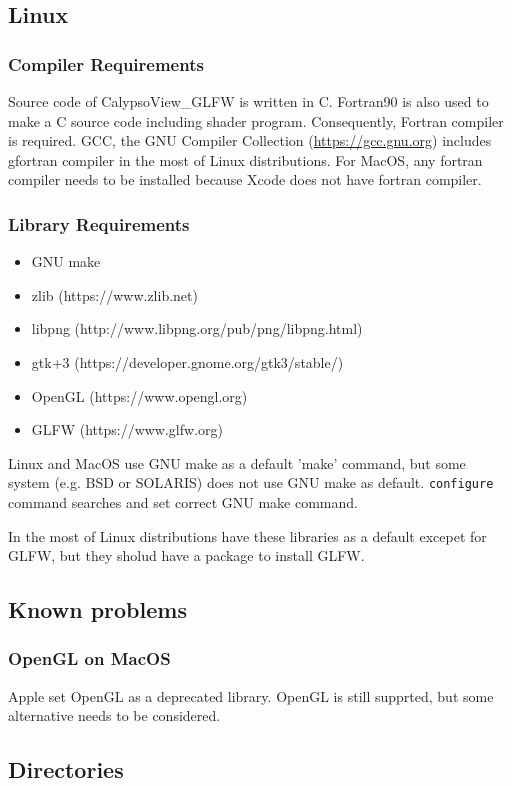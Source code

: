 \subsection{Linux}
\subsubsection{Compiler Requirements}
Source code of CalypsoView\_GLFW is written in C. Fortran90 is also used to make a C source code including shader program. Consequently, Fortran compiler is required. GCC, the GNU Compiler Collection (\url{https://gcc.gnu.org}) includes gfortran compiler in the most of Linux distributions. For MacOS, any fortran compiler needs to be installed because Xcode does not have fortran compiler.

\subsubsection{Library Requirements}
\label{sec:requirements}
\begin{itemize}
\item GNU make
\item zlib (https://www.zlib.net)
\item libpng (http://www.libpng.org/pub/png/libpng.html)
\item gtk+3  (https://developer.gnome.org/gtk3/stable/)
\item OpenGL (https://www.opengl.org)
\item GLFW   (https://www.glfw.org)
\end{itemize}
Linux and MacOS use GNU make as a default 'make' command, but some system (e.g. BSD or SOLARIS) does not use GNU make as default. \verb|configure| command searches and set correct GNU make command.

In the most of Linux distributions have these libraries as a default excepet for {\color{red} GLFW}, but they sholud have a package to install GLFW.


\subsection{Known problems}
\subsubsection*{OpenGL on MacOS}
Apple set OpenGL as a deprecated library. OpenGL is still supprted, but some alternative needs to be considered.

\subsection{Directories}

